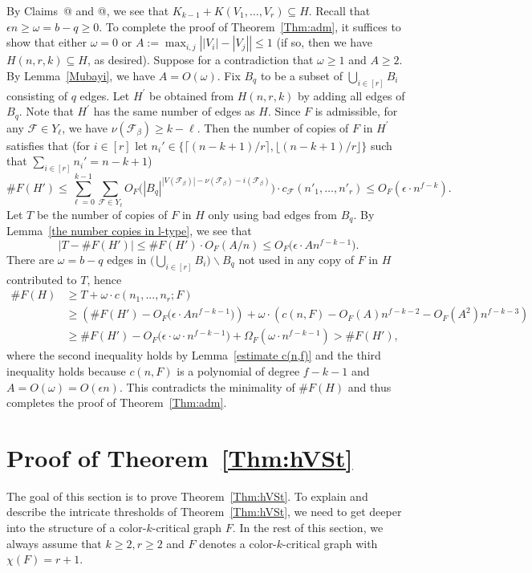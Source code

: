 \documentclass[10pt]{article}
\makeatletter
\newcommand*{\rom}[1]{\expandafter\@slowromancap\romannumeral #1@}
\def\QED{{\hfill\enspace\vrule height8pt depth0pt width8pt}}
\makeatother
\begin{document}
By Claims~\rom{4} and \rom{5}, we see that $K_{k-1}+K(V_1,\ldots,V_r)\subseteq H$.
Recall that $\epsilon n\geq \omega=b-q\geq 0$.
To complete the proof of Theorem~\ref{Thm:adm}, it suffices to show that either $\omega=0$ or $A:=\max_{i,j}\left||V_i|-|V_j|\right|\leq 1$
(if so, then we have $H(n,r,k)\subseteq H$, as desired).
Suppose for a contradiction that $\omega\geq 1$ and $A\geq 2$.
By Lemma~\ref{Mubayi}, we have $A=O(\omega)$.
Fix $B_q$ to be a subset of $\bigcup_{i\in [r]} B_i$ consisting of $q$ edges.
Let $H^{\prime}$ be obtained from $H(n,r,k)$ by adding all edges of $B_q$.
Note that $H^{\prime}$ has the same number of edges as $H$.
Since $F$ is admissible, for any $\mathcal{F}\in Y_\ell$, we have $\nu(\mathcal{F}_\beta)\geq k-\ell$.
Then the number of copies of $F$ in $H^\prime$ satisfies that (for $i\in [r]$ let $n_i'\in \{\lceil (n-k+1)/r \rceil,\lfloor(n-k+1)/r \rfloor\}$ such that $\sum_{i\in [r]} n_i'=n-k+1$)
$$\#F(H') \leq \sum_{\ell=0}^{k-1}\sum_{\mathcal{F}\in Y_\ell}O_F\big(|B_q|^{|V(\mathcal{F}_\beta)|-\nu(\mathcal{F}_\beta)-i(\mathcal{F}_\beta)}\big)\cdot c_\mathcal{F}(n'_1,\ldots,n'_r)  \leq O_F(\epsilon\cdot n^{f-k}).$$
Let $T$ be the number of copies of $F$ in $H$ only using bad edges from $B_q$.
By Lemma~\ref{the number copies in l-type}, we see that
$$|T-\#F(H')|\leq \#F(H')\cdot O_F(A/n)\leq O_F\big(\epsilon\cdot A n^{f-k-1}\big).$$
There are $\omega=b-q$ edges in $\big(\bigcup_{i\in [r]} B_i\big)\backslash B_q$ not used in any copy of $F$ in $H$ contributed to $T$,
hence
\begin{align*}
\#F(H)&\geq T+\omega\cdot c(n_1,...,n_r;F)\\
&\geq \left(\#F(H')-O_F\big(\epsilon\cdot A n^{f-k-1}\big)\right)+\omega\cdot \left(c(n,F)-O_F(A) n^{f-k-2} -O_F(A^2)n^{f-k-3}\right)\\
&\geq \#F(H')-O_F\big(\epsilon\cdot \omega\cdot n^{f-k-1}\big)+\Omega_F(\omega\cdot n^{f-k-1})> \#F(H'),
\end{align*}
where the second inequality holds by Lemma~\ref{estimate c(n,f)} and the third inequality holds because $c(n,F)$ is a polynomial of degree $f-k-1$ and $A=O(\omega)=O(\epsilon n)$.
This contradicts the minimality of $\#F(H)$ and thus completes the proof of Theorem~\ref{Thm:adm}.
\QED





\section{Proof of Theorem~\ref{Thm:hVSt}}\label{section s and t}
The goal of this section is to prove Theorem~\ref{Thm:hVSt}.
To explain and describe the intricate thresholds of Theorem~\ref{Thm:hVSt},
we need to get deeper into the structure of a color-$k$-critical graph $F$.
In the rest of this section, we always assume that $k\geq 2, r\geq 2$ and $F$ denotes a color-$k$-critical graph with $\chi(F)=r+1$.
\end{document}
